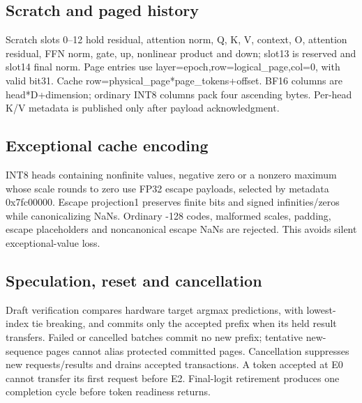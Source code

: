 \documentclass[11pt,a4paper]{article}
\begin{document}
\subsection{Scratch and paged history}

Scratch slots 0–12 hold residual,\allowbreak{} attention norm,\allowbreak{} Q,\allowbreak{} K,\allowbreak{} V,\allowbreak{} context,\allowbreak{} O,\allowbreak{} attention residual,\allowbreak{} FFN norm,\allowbreak{} gate,\allowbreak{} up,\allowbreak{} nonlinear product and down; slot13 is reserved and slot14 final norm. Page entries use layer=\allowbreak{}epoch,\allowbreak{}row=\allowbreak{}logical\_\allowbreak{}page,\allowbreak{}col=\allowbreak{}0,\allowbreak{} with valid bit31. Cache row=\allowbreak{}physical\_\allowbreak{}page*\allowbreak{}page\_\allowbreak{}tokens+\allowbreak{}offset. BF16 columns are head*\allowbreak{}D+\allowbreak{}dimension; ordinary INT8 columns pack four ascending bytes. Per-head K/\allowbreak{}V metadata is published only after payload acknowledgment.

\subsection{Exceptional cache encoding}

INT8 heads containing nonfinite values,\allowbreak{} negative zero or a nonzero maximum whose scale rounds to zero use FP32 escape payloads,\allowbreak{} selected by metadata 0x7fc00000. Escape projection1 preserves finite bits and signed infinities/\allowbreak{}zeros while canonicalizing NaNs. Ordinary -128 codes,\allowbreak{} malformed scales,\allowbreak{} padding,\allowbreak{} escape placeholders and noncanonical escape NaNs are rejected. This avoids silent exceptional-value loss.

\subsection{Speculation,\allowbreak{} reset and cancellation}

Draft verification compares hardware target argmax predictions,\allowbreak{} with lowest-index tie breaking,\allowbreak{} and commits only the accepted prefix when its held result transfers. Failed or cancelled batches commit no new prefix; tentative new-sequence pages cannot alias protected committed pages. Cancellation suppresses new requests/\allowbreak{}results and drains accepted transactions. A token accepted at E0 cannot transfer its first request before E2. Final-logit retirement produces one completion cycle before token readiness returns.
\end{document}
